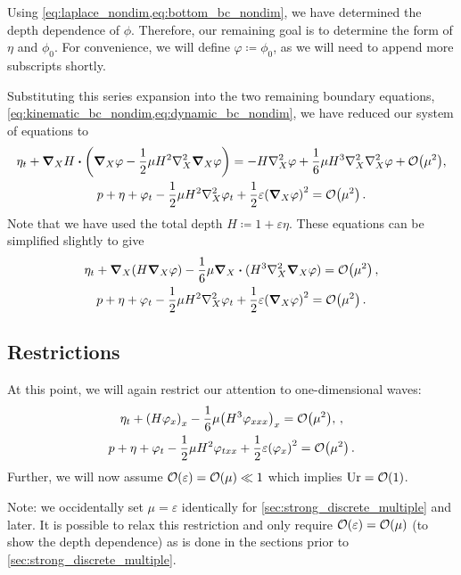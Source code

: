 \documentclass{jfm}
\let\Oldsubsection\subsection
\renewcommand{\subsection}{\FloatBarrier\Oldsubsection}
\DeclareMathOperator{\Ur}{Ur}
\renewcommand*{\epsilon}{\varepsilon}
\begin{document}
Using \cref{eq:laplace_nondim,eq:bottom_bc_nondim}, we have determined
the depth dependence of $\phi$.
Therefore, our remaining goal is to determine the form of $\eta$ and
$\phi_0$.
For convenience, we will define $\varphi \coloneqq \phi_0$, as we will
need to append more subscripts shortly.

Substituting this series expansion into the two
remaining boundary equations,
\cref{eq:kinematic_bc_nondim,eq:dynamic_bc_nondim}, we have reduced our
system of equations to
\begin{gather}
  \eta_t + \grad_X{H}\vdot\pqty{\grad_X\varphi
    -\frac{1}{2}\mu H^2\laplacian_X\grad_X\varphi} =
    -H\laplacian_X\varphi
  +\frac{1}{6}\mu H^3\laplacian_X\laplacian_X\varphi +
    \order{\mu^2}, \\
  p + \eta + \varphi_{t} - \frac{1}{2}\mu H^2\laplacian_X\varphi_{t} +
    \frac{1}{2}\epsilon \pqty{\grad_X\varphi}^2 = \order{\mu^2}
    \,.
\end{gather}
Note that we have used the total depth $H\coloneqq 1+\epsilon\eta$.
These equations can be simplified slightly to give
\begin{gather}
  \eta_t + \grad_X(H\grad_X\varphi)
    -\frac{1}{6}\mu \grad_X\vdot(H^3\laplacian_X\grad_X\varphi) =
    \order{\mu^2} \,, \\
  p + \eta + \varphi_{t} - \frac{1}{2}\mu H^2\laplacian_X\varphi_{t} +
    \frac{1}{2}\epsilon\pqty{\grad_X\varphi}^2 = \order{\mu^2}
    \,.
\end{gather}

\subsection{Restrictions}
At this point, we will again restrict our attention to one-dimensional
waves:
\begin{gather}
  \eta_t + \pqty{H\varphi_x}_x
    -\frac{1}{6}\mu \pqty{H^3\varphi_{xxx}}_x =
    \order{\mu^2}, \label{eq:kinematic_bc_varphi} \,, \\
  p +\eta + \varphi_t - \frac{1}{2}\mu H^2\varphi_{txx} +
    \frac{1}{2}\epsilon\pqty{\varphi_x}^2 = \order{\mu^2} \,.
  \label{eq:dynamic_bc_varphi}
\end{gather}
Further, we will now assume $\order{\epsilon} = \order{\mu} \ll 1$ which
implies $\Ur = \order{1}$.

Note: we occidentally set $\mu=\epsilon$ identically for
\cref{sec:strong_discrete_multiple} and later.
It is possible to relax this restriction and only require
$\order{\epsilon} = \order{\mu}$ (to show the depth dependence) as is
done in the sections prior to \cref{sec:strong_discrete_multiple}.
\end{document}
